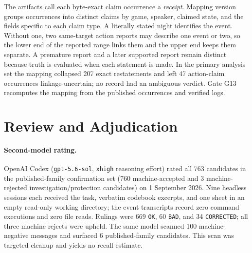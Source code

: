 \documentclass[11pt]{article}
\newcommand{\code}[1]{\texttt{#1}}
\begin{document}
The artifacts call each byte-exact claim occurrence a \emph{receipt}. Mapping version  groups occurrences into distinct claims by game, speaker, claimed state, and the fields specific to each claim type. A literally stated night identifies the event. Without one, two same-target action reports may describe one event or two, so the lower end of the reported range links them and the upper end keeps them separate. A premature report and a later supported report remain distinct because truth is evaluated when each statement is made. In the primary analysis set the mapping collapsed 207 exact restatements and left 47 action-claim occurrences linkage-uncertain; no record had an ambiguous verdict. Gate G13 recomputes the mapping from the published occurrences and verified logs.

\section{Review and Adjudication}
\label{app:adjudication}
\paragraph{Second-model rating.} OpenAI Codex (\code{gpt-5.6-sol}, \code{xhigh} reasoning effort) rated all 763 candidates in the published-family confirmation set (760 machine-accepted and 3 machine-rejected investigation/protection candidates) on 1 September 2026. Nine headless sessions each received the task, verbatim codebook excerpts, and one sheet in an empty read-only working directory; the event transcripts record zero command executions and zero file reads. Rulings were 669 \code{OK}, 60 \code{BAD}, and 34 \code{CORRECTED}; all three machine rejects were upheld. The same model scanned 100 machine-negative messages and surfaced 6 published-family candidates. This scan was targeted cleanup and yields no recall estimate.
\end{document}

